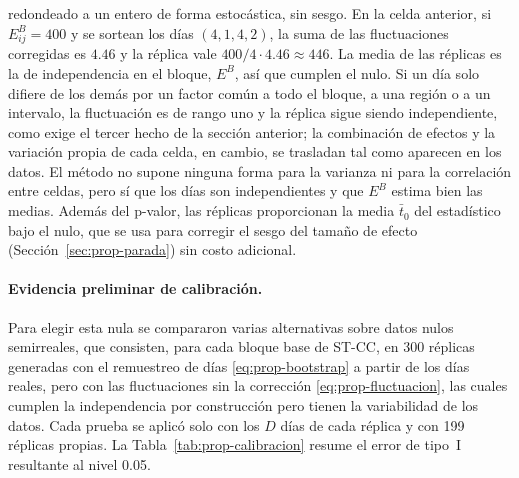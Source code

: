 redondeado a un entero de forma estocástica, sin sesgo. En la celda anterior, si
$E^B_{ij}=400$ y se sortean los días $(4,1,4,2)$, la suma de las fluctuaciones
corregidas es $4.46$ y la réplica vale $400/4\cdot4.46\approx446$. La media de las réplicas
es la de independencia en el bloque, $E^B$, así que cumplen el nulo. Si un día
solo difiere de los demás por un factor común a todo el bloque, a una región o
a un intervalo, la fluctuación es de rango uno y la réplica sigue siendo
independiente, como exige el tercer hecho de la sección anterior; la combinación
de efectos y la variación propia de cada celda, en cambio, se trasladan tal como
aparecen en los datos. El método no supone ninguna forma para la varianza ni
para la correlación entre celdas, pero sí que los días son independientes y que
$E^B$ estima bien las medias. Además del p-valor, las réplicas proporcionan la
media $\bar t_0$ del estadístico bajo el nulo, que se usa para corregir el sesgo
del tamaño de efecto (Sección~\ref{sec:prop-parada}) sin costo adicional.

\paragraph{Evidencia preliminar de calibración.} Para elegir esta nula se
compararon varias alternativas sobre datos nulos semirreales, que consisten, para cada bloque
base de ST-CC, en 300 réplicas generadas con el remuestreo de días
\eqref{eq:prop-bootstrap} a partir de los días reales, pero con las fluctuaciones
sin la corrección \eqref{eq:prop-fluctuacion}, las cuales cumplen la independencia por construcción pero tienen la
variabilidad de los datos. Cada prueba se aplicó solo con los $D$ días de cada
réplica y con 199 réplicas propias. La Tabla~\ref{tab:prop-calibracion} resume
el error de tipo~I resultante al nivel 0.05.

